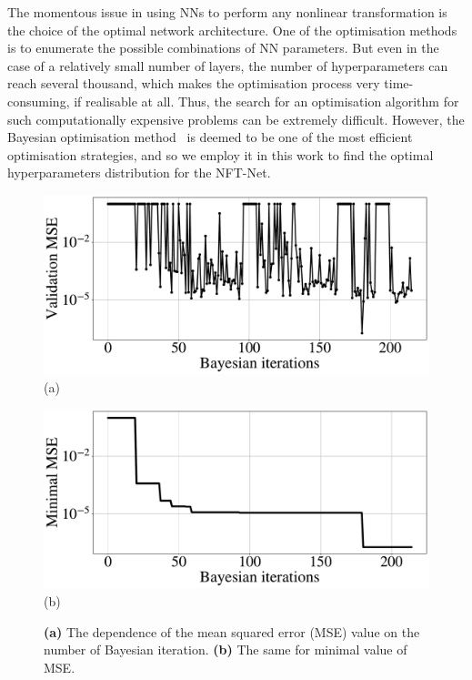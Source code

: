 The momentous issue in using NNs to perform any nonlinear transformation is the choice of the optimal network architecture. One of the optimisation methods is to enumerate the possible combinations of NN parameters. But even in the case of a relatively small number of layers, the number of hyperparameters can reach several thousand, which makes the optimisation process very time-consuming, if realisable at all. Thus, the search for an optimisation algorithm for such computationally expensive problems can be extremely difficult. However, the Bayesian optimisation method~\cite{pelikan1999boa} is deemed to be one of the most efficient optimisation strategies, and so we employ it in this work to find the optimal hyperparameters distribution for the NFT-Net.



\begin{figure}[t]
\centering
\begin{minipage}{.49\textwidth}
  \centering
  \includegraphics[width=.92\linewidth]{images/nn_nft/scirep_bayes.pdf} (a)
\end{minipage}%
\begin{minipage}{.49\textwidth}
  \centering
  \includegraphics[width=.92\linewidth]{images/nn_nft/scirep_bayes_min.pdf} (b)
\end{minipage}
\caption{\textbf{(a)} The dependence of the mean squared error (MSE) value on the number of Bayesian iteration. \textbf{(b)} The same for minimal value of MSE.}
\label{fig:bayes_full}
\end{figure}



